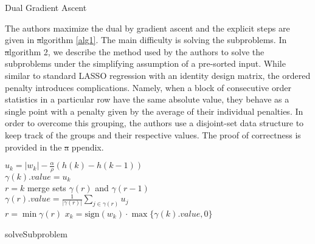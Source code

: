 \documentclass{uwstat572}
\newcommand{\vmdel}[1]{\sout{#1}}
\newcommand{\vmadd}[1]{\textbf{\color{red}{#1}}}
\theoremstyle{remark}
\theoremstyle{definition}
\begin{document}
\begin{algorithm}[!htp]
\caption{Dual Gradient Ascent}\label{alg1}
\end{algorithm}

The authors maximize the dual by gradient ascent and the explicit steps are given in \vmdel{a}\vmadd{A}lgorithm \ref{alg1}.  The main difficulty is solving the subproblems. In \vmdel{a}\vmadd{A}lgorithm 2, we describe the method used by the authors to solve the subproblems under the simplifying assumption of a pre-sorted input.  While similar to standard LASSO regression with an identity design matrix, the ordered penalty introduces complications.  Namely, when a block of consecutive order statistics in a particular row have the same absolute value, they behave as a single point with a penalty given by the average of their individual penalties.  In order to overcome this grouping, the authors use a disjoint-set data structure to keep track of the groups and their respective values. The proof of correctness is provided in the \vmdel{a} \vmadd{A}ppendix.

\begin{algorithm}[!htp]
    {
        $u_k = |w_k| - \frac{\alpha}{\rho} (h(k) - h(k-1))$
        \\
        $\gamma(k).value = u_k$
        \\
        $r = k$
            {
                merge sets $\gamma(r)$ and $\gamma(r-1)$
                \\
                $\gamma(r).value = \frac{1}{|\gamma(r)|} \sum_{j \in \gamma(r)} u_j$
                \\
                $r = \min \gamma(r)$
        }
    }
    {
        $x_k = {\text{sign}}(w_k) \cdot \max\{\gamma(k).value,0\}$
    }
    \caption{solveSubproblem}\label{alg2}
\end{algorithm}
\end{document}

